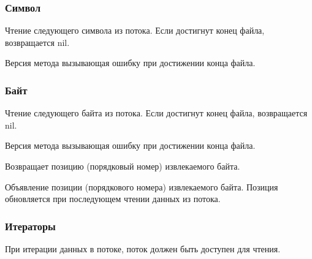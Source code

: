\subsubsection*{Символ}

\begin{methodlist}
  Чтение следующего символа из потока. Если достигнут конец файла, возвращается nil.

  Версия метода вызывающая ошибку при достижении конца файла. 
\end{methodlist}

\subsubsection*{Байт}

\begin{methodlist}
  Чтение следующего байта из потока. Если достигнут конец файла, возвращается nil. 
 
  Версия метода вызывающая ошибку при достижении конца файла. 
 
  Возвращает позицию (порядковый номер) извлекаемого байта. 
 
  Объявление позиции (порядкового номера) извлекаемого байта. Позиция обновляется при последующем чтении данных из потока.
\end{methodlist}

\subsubsection*{Итераторы}

При итерации данных в потоке, поток должен быть доступен для чтения.

